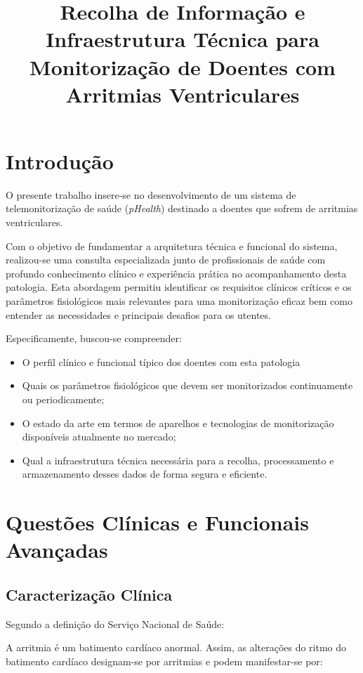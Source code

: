 \documentclass[11pt,a4paper]{article}
\title{Recolha de Informação e Infraestrutura Técnica para Monitorização de 
Doentes com Arritmias Ventriculares}
\author{}
\date{}
\begin{document}
\maketitle

\section*{Introdução}

O presente trabalho insere-se no desenvolvimento de um sistema de
telemonitorização de saúde (\textit{pHealth}) destinado a doentes que sofrem
de arritmias ventriculares.

Com o objetivo de fundamentar a arquitetura técnica e funcional do sistema,
realizou-se uma consulta especializada junto de profissionais de saúde com
profundo conhecimento clínico e experiência prática no acompanhamento desta
patologia. Esta abordagem permitiu identificar os requisitos clínicos críticos
e os parâmetros fisiológicos mais relevantes para uma monitorização eficaz bem
como entender as necessidades e principais desafios para os utentes.

Especificamente, buscou-se compreender:
\begin{itemize}
    \item O perfil clínico e funcional típico dos doentes com esta patologia
    \item Quais os parâmetros fisiológicos que devem ser monitorizados continuamente ou
          periodicamente;
    \item O estado da arte em termos de aparelhos e tecnologias de monitorização
          disponíveis atualmente no mercado;
    \item Qual a infraestrutura técnica necessária para a recolha, processamento e
          armazenamento desses dados de forma segura e eficiente.
\end{itemize}

\section*{Questões Clínicas e Funcionais Avançadas}

\subsection*{Caracterização Clínica}

Segundo a definição do Serviço Nacional de Saúde: 

A arritmia é um batimento cardíaco anormal. Assim, as alterações do ritmo do batimento cardíaco designam-se por arritmias e podem manifestar-se por:
\end{document}
